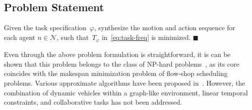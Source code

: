 \subsection{Problem Statement}\label{subsec:problem-statement}

\begin{problem}\label{prob:formulation}
Given the task specification~$\varphi$,
synthesize the motion and action
sequence for each agent $n\in \mathcal{N}$,
such that~$T_{\varphi}$ in~\eqref{eq:task-freq} is minimized.
\hfill $\blacksquare$
\end{problem}
Even through the above problem formulation is straightforward,
it is can be shown that this problem belongs to the class of NP-hard
problems~\cite{hochba1997approximation, bovet1994introduction},
as its core coincides with the makespan minimization problem
of flow-shop scheduling problems.
Various approximate algorithms have been proposed in~\cite{khamis2015multi, hoos2004stochastic}.
However,
the combination of dynamic vehicles within a graph-like environment,
linear temporal constraints,
and collaborative tasks has not been addressed.
